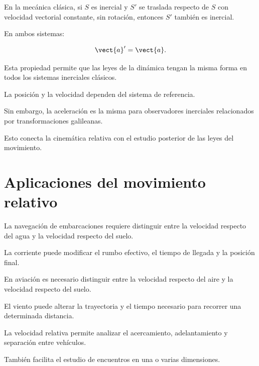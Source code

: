 En la mecánica clásica, si \(S\) es inercial
y \(S'\) se traslada respecto de \(S\)
con velocidad vectorial constante, sin rotación,
entonces \(S'\) también es inercial.

En ambos sistemas:

\[
\vect{a}'=\vect{a}.
\]

Esta propiedad permite que las leyes
de la dinámica tengan la misma forma
en todos los sistemas inerciales clásicos.

\begin{interpretacion}

La posición y la velocidad dependen
del sistema de referencia.

Sin embargo, la aceleración es la misma
para observadores inerciales relacionados
por transformaciones galileanas.

Esto conecta la cinemática relativa
con el estudio posterior de las leyes
del movimiento.

\end{interpretacion}


\section{Aplicaciones del movimiento relativo}

\begin{aplicacion}[Navegación]

La navegación de embarcaciones requiere distinguir
entre la velocidad respecto del agua
y la velocidad respecto del suelo.

La corriente puede modificar el rumbo efectivo,
el tiempo de llegada y la posición final.

\end{aplicacion}

\begin{aplicacion}[Aviación]

En aviación es necesario distinguir
entre la velocidad respecto del aire
y la velocidad respecto del suelo.

El viento puede alterar la trayectoria
y el tiempo necesario para recorrer
una determinada distancia.

\end{aplicacion}

\begin{aplicacion}

La velocidad relativa permite analizar
el acercamiento, adelantamiento y separación
entre vehículos.

También facilita el estudio de encuentros
en una o varias dimensiones.

\end{aplicacion}

